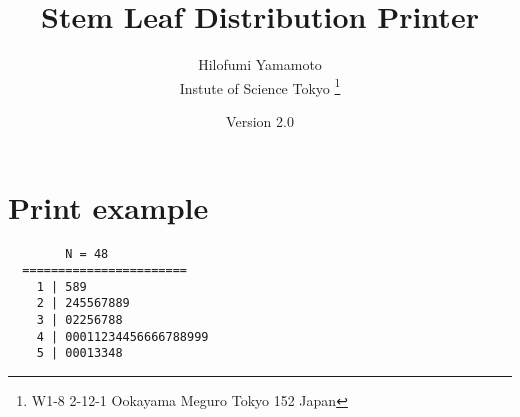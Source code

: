 \documentclass[uplatex,a4paper]{jsarticle}
\begin{document}
\title{Stem Leaf Distribution Printer}
\author{Hilofumi Yamamoto \\ Instute of Science Tokyo
\thanks{W1-8 2-12-1 Ookayama Meguro Tokyo 152 Japan}}
\date{Version 2.0}
\maketitle

\section{Print example}

\begin{verbatim}
        N = 48
  =======================
    1 | 589
    2 | 245567889
    3 | 02256788
    4 | 00011234456666788999
    5 | 00013348
\end{verbatim}
\end{document}
